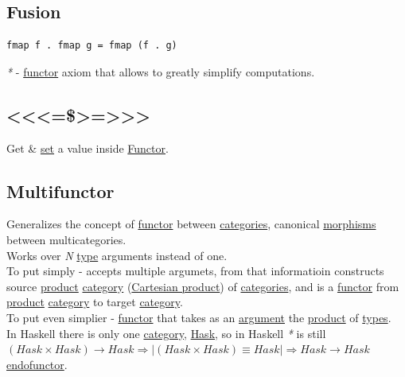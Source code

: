 \documentclass[a4paper,14pt,oneside]{book}
\begin{document}
{\subsection{\label{org822c67f}Fusion}
\label{sec:org0cc053e}
\begin{verbatim}
fmap f . fmap g = fmap (f . g)
\end{verbatim}

\emph{*} - \hyperref[orgba8e41d]{functor} axiom that allows to greatly simplify computations.\\

\subsection{<<<=\$>=>>>}
\label{sec:org519a4fa}
Get \& \hyperref[org0726f94]{set} a value inside \hyperref[orgba8e41d]{Functor}.\\

\subsection{\label{org6751837}Multifunctor}
\label{sec:org3df31b4}
Generalizes the concept of \hyperref[orgba8e41d]{functor} between \hyperref[org418901f]{categories}, canonical \hyperref[org43d1069]{morphisms} between multicategories.\\

Works over \emph{N} \hyperref[orga9ca243]{type} arguments instead of one.\\

To put simply - accepts multiple argumets, from that informatioin constructs source \hyperref[org3792151]{product} \hyperref[orgf2b19ad]{category} (\hyperref[org7dc1e4c]{Cartesian product}) of \hyperref[org418901f]{categories}, and is a \hyperref[orgba8e41d]{functor} from \hyperref[org3792151]{product} \hyperref[orgf2b19ad]{category} to target \hyperref[orgf2b19ad]{category}.\\

To put even simplier - \hyperref[orgba8e41d]{functor} that takes as an \hyperref[orgdd12744]{argument} the \hyperref[org3792151]{product} of \hyperref[org51532d9]{types}.\\

In Haskell there is only one \hyperref[orgf2b19ad]{category}, \hyperref[org9e6eb99]{Hask}, so in Haskell \emph{*} is still \((Hask \times Hask) \rightarrow Hask \Rightarrow | (Hask \times Hask) \equiv Hask | \Rightarrow Hask \rightarrow Hask\) \hyperref[org4c57b82]{endofunctor}.\\

}
\end{document}

